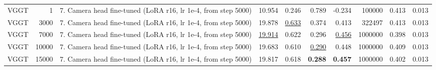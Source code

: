 \begin{table}[H]
\begin{tabular}{lrlrrrrrrr}
VGGT & 1 & 7. Camera head fine-tuned (LoRA r16, lr 1e-4, from step 5000) & 10.954 & 0.246 & 0.789 & -0.234 & 100000 & 0.413 & 0.013 \\
VGGT & 3000 & 7. Camera head fine-tuned (LoRA r16, lr 1e-4, from step 5000) & 19.878 & \underline{0.633} & 0.374 & 0.413 & 322497 & 0.413 & 0.013 \\
VGGT & 7000 & 7. Camera head fine-tuned (LoRA r16, lr 1e-4, from step 5000) & \underline{19.914} & 0.622 & 0.296 & \underline{0.456} & 1000000 & 0.398 & 0.013 \\
VGGT & 10000 & 7. Camera head fine-tuned (LoRA r16, lr 1e-4, from step 5000) & 19.683 & 0.610 & \underline{0.290} & 0.448 & 1000000 & 0.409 & 0.013 \\
VGGT & 15000 & 7. Camera head fine-tuned (LoRA r16, lr 1e-4, from step 5000) & 19.817 & 0.618 & \textbf{0.288} & \textbf{0.457} & 1000000 & 0.402 & 0.013 \\
\bottomrule
\end{tabular}
\end{table}